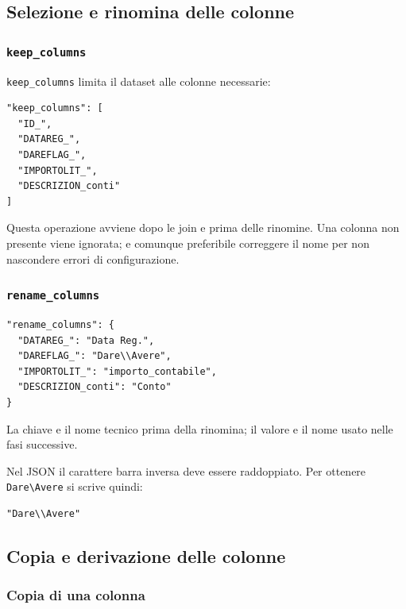 \subsection{Selezione e rinomina delle colonne}

\subsubsection{\texttt{keep\_columns}}

\texttt{keep\_columns} limita il dataset alle colonne necessarie:

\begin{lstlisting}
"keep_columns": [
  "ID_",
  "DATAREG_",
  "DAREFLAG_",
  "IMPORTOLIT_",
  "DESCRIZION_conti"
]
\end{lstlisting}

Questa operazione avviene dopo le join e prima delle rinomine. Una colonna non
presente viene ignorata; e comunque preferibile correggere il nome per non
nascondere errori di configurazione.

\subsubsection{\texttt{rename\_columns}}

\begin{lstlisting}
"rename_columns": {
  "DATAREG_": "Data Reg.",
  "DAREFLAG_": "Dare\\Avere",
  "IMPORTOLIT_": "importo_contabile",
  "DESCRIZION_conti": "Conto"
}
\end{lstlisting}

La chiave e il nome tecnico prima della rinomina; il valore e il nome usato
nelle fasi successive.

Nel JSON il carattere barra inversa deve essere raddoppiato. Per ottenere
\texttt{Dare\textbackslash Avere} si scrive quindi:

\begin{lstlisting}
"Dare\\Avere"
\end{lstlisting}

\subsection{Copia e derivazione delle colonne}

\subsubsection{Copia di una colonna}

